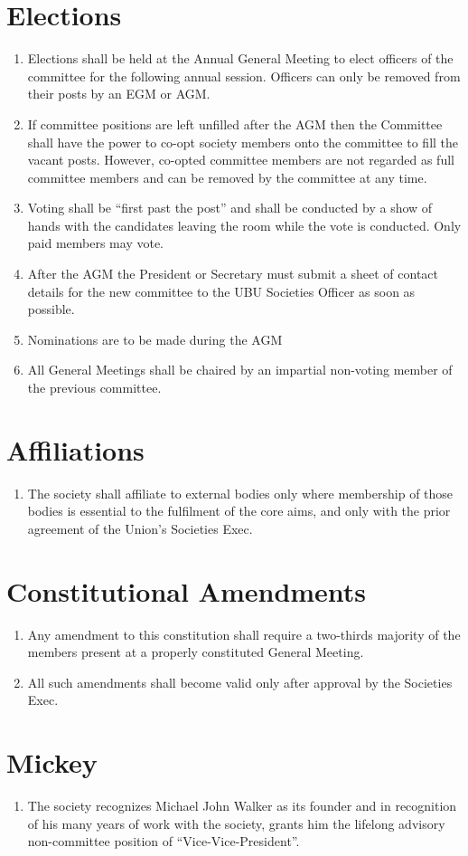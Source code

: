 \documentclass[a4paper,10pt]{article}
\begin{document}
\section{Elections}
\begin{enumerate}
  \item Elections shall be held at the Annual General Meeting to elect officers of the committee for the following annual session. Officers can only be removed from their posts by an EGM or AGM.
  \item If committee positions are left unfilled after the AGM then the Committee shall have the power to co-opt society members onto the committee to fill the vacant posts. However, co-opted committee members are not regarded as full committee members and can be removed by the committee at any time.
  \item Voting shall be “first past the post” and shall be conducted by a show of hands with the candidates leaving the room while the vote is conducted. Only paid members may vote.
  \item After the AGM the President or Secretary must submit a sheet of contact details for the new committee to the UBU Societies Officer as soon as possible.
  \item Nominations are to be made during the AGM
  \item All General Meetings shall be chaired by an impartial non-voting member of the previous committee.
\end{enumerate}

\section{Affiliations}
\begin{enumerate}
  \item The society shall affiliate to external bodies only where membership of those bodies is essential to the fulfilment of the core aims, and only with the prior agreement of the Union’s Societies Exec.
\end{enumerate}

\section{Constitutional Amendments}
\begin{enumerate}
  \item Any amendment to this constitution shall require a two-thirds majority of the members present at a properly constituted General Meeting.
  \item All such amendments shall become valid only after approval by the Societies Exec.
\end{enumerate}

\section{Mickey}
\begin{enumerate}
  \item The society recognizes Michael John Walker as its founder and in recognition of his many years of work with the society, grants him the lifelong advisory non-committee position of “Vice-Vice-President”.
\end{enumerate}
\end{document}
